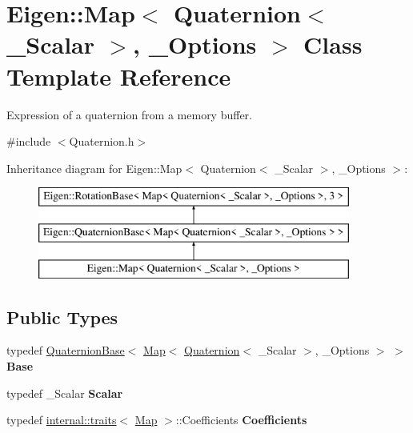 \hypertarget{class_eigen_1_1_map_3_01_quaternion_3_01___scalar_01_4_00_01___options_01_4}{}\section{Eigen\+::Map$<$ Quaternion$<$ \+\_\+\+Scalar $>$, \+\_\+\+Options $>$ Class Template Reference}
\label{class_eigen_1_1_map_3_01_quaternion_3_01___scalar_01_4_00_01___options_01_4}


Expression of a quaternion from a memory buffer.  




{\ttfamily \#include $<$Quaternion.\+h$>$}

Inheritance diagram for Eigen\+::Map$<$ Quaternion$<$ \+\_\+\+Scalar $>$, \+\_\+\+Options $>$\+:\begin{figure}[H]
\begin{center}
\leavevmode
\includegraphics[height=3.000000cm]{class_eigen_1_1_map_3_01_quaternion_3_01___scalar_01_4_00_01___options_01_4}
\end{center}
\end{figure}
\subsection*{Public Types}
\begin{DoxyCompactItemize}
\item 
\mbox{\label{class_eigen_1_1_map_3_01_quaternion_3_01___scalar_01_4_00_01___options_01_4_a12b0cf525b06dcf4693dd8e32b843098}} 
typedef \mbox{\hyperlink{class_eigen_1_1_quaternion_base}{Quaternion\+Base}}$<$ \mbox{\hyperlink{class_eigen_1_1_map}{Map}}$<$ \mbox{\hyperlink{class_eigen_1_1_quaternion}{Quaternion}}$<$ \+\_\+\+Scalar $>$, \+\_\+\+Options $>$ $>$ {\bfseries Base}
\item 
\mbox{\label{class_eigen_1_1_map_3_01_quaternion_3_01___scalar_01_4_00_01___options_01_4_aa51f781c0c3113e86daa2d99bf586cfc}} 
typedef \+\_\+\+Scalar {\bfseries Scalar}
\item 
\mbox{\label{class_eigen_1_1_map_3_01_quaternion_3_01___scalar_01_4_00_01___options_01_4_ad00baac2e7bbfce42d69ec4299100e6c}} 
typedef \mbox{\hyperlink{struct_eigen_1_1internal_1_1traits}{internal\+::traits}}$<$ \mbox{\hyperlink{class_eigen_1_1_map}{Map}} $>$\+::Coefficients {\bfseries Coefficients}
\end{DoxyCompactItemize}
